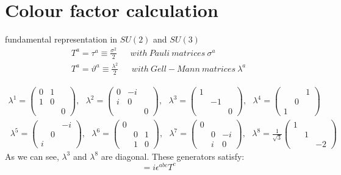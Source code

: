 \section{Colour factor calculation}
fundamental representation in $ SU(2) $ and $ SU(3) $
\begin{equation}
\begin{split}
T^a = \tau^a \equiv \frac{\sigma ^2}{2}\:\:\:\:\:\:\: \mathit{with\: Pauli\: matrices\: \sigma ^a}\\
T^a = \vartheta^a \equiv \frac{\lambda ^2}{2} \:\:\:\:\:\:\: \mathit{with\: Gell-Mann\: matrices\: \lambda ^a}
\end{split}
\end{equation}

\begin{equation}
\begin{split}
\lambda ^1 =\begin{pmatrix} 0& 1 &\\ 1& 0 &\\ & & 0 \end{pmatrix},\:\:\: \lambda ^2 =\begin{pmatrix} 0& -i &\\ i& 0 &\\ & & 0 \end{pmatrix}, 
\:\:\: \lambda ^3 =\begin{pmatrix} 1&  &\\ & -1 &\\ & & 0 \end{pmatrix}, \:\:\: \lambda ^4 =\begin{pmatrix} &  &1\\ & 0&\\1 & &  \end{pmatrix}\\\
\lambda ^5 =\begin{pmatrix} &  &-i\\ & 0 &\\ i& &  \end{pmatrix},\:\:\: \lambda ^6 =\begin{pmatrix} 0&  &\\ & 0 &1\\ & 1& 0 \end{pmatrix}, 
\:\:\: \lambda ^7 =\begin{pmatrix} 0&  &\\ & 0 &-i\\ & i& 0 \end{pmatrix}, \:\:\: \lambda ^8 =\frac{1}{\sqrt3}\begin{pmatrix} 1&  &\\ & 1&\\ & &-2  \end{pmatrix}
\end{split}
\end{equation}
As we can see, $ {\lambda}^3 $ and $  {\lambda}^8 $ are diagonal.
These generators satisfy:
\begin{equation}
[T^a, T^b] = i \epsilon^{abc} T^c
\end{equation}

